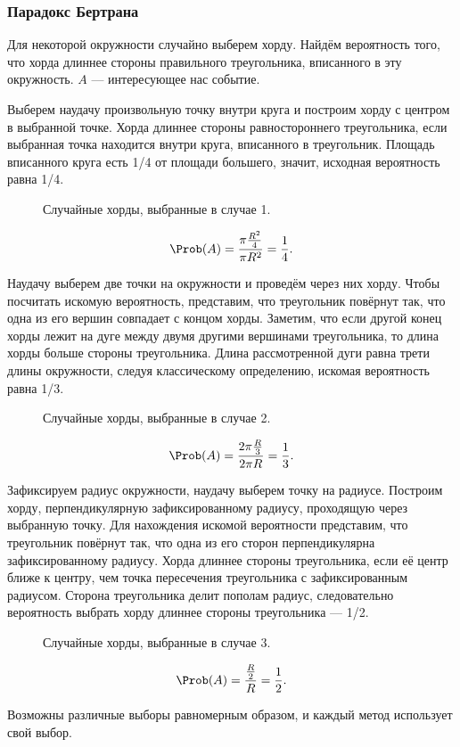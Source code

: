 \subsubsection{Парадокс Бертрана}
Для некоторой окружности случайно выберем хорду. Найдём вероятность того, что хорда длиннее стороны правильного треугольника, вписанного в эту окружность. $A$ --- интересующее нас событие.
\begin{description}[leftmargin=0cm]
	\item[Метод «случайного центра».] Выберем наудачу произвольную точку внутри круга и построим хорду с центром в выбранной точке. Хорда длиннее стороны равностороннего треугольника, если выбранная точка находится внутри круга, вписанного в треугольник. Площадь вписанного круга есть 1/4 от площади большего, значит, исходная вероятность равна 1/4.
	      \begin{figure}[ht]
		      \centering
		      \def\svgwidth{8em}
		      
		      \caption{Случайные хорды, выбранные в случае 1.}
	      \end{figure}
	      \[
		      \Prob(A) = \frac{\pi \frac{R^2}{4}}{\pi R^2} = \frac{1}{4}.
	      \]
	\item[Метод «случайных концов».] Наудачу выберем две точки на окружности и проведём через них хорду. Чтобы посчитать искомую вероятность, представим, что треугольник повёрнут так, что одна из его вершин совпадает с концом хорды. Заметим, что если другой конец хорды лежит на дуге между двумя другими вершинами треугольника, то длина хорды больше стороны треугольника. Длина рассмотренной дуги равна трети длины окружности, следуя классическому определению, искомая вероятность равна 1/3.
	      \begin{figure}[ht]
		      \centering
		      \def\svgwidth{8em}
		      
		      \caption{Случайные хорды, выбранные в случае 2.}
	      \end{figure}
	      \[
		      \Prob(A) = \frac{2\pi \frac{R}{3}}{2 \pi R} = \frac{1}{3}.
	      \]
	\item[Метод «случайного радиуса».] Зафиксируем радиус окружности, наудачу выберем точку на радиусе. Построим хорду, перпендикулярную зафиксированному радиусу, проходящую через выбранную точку. Для нахождения искомой вероятности представим, что треугольник повёрнут так, что одна из его сторон перпендикулярна зафиксированному радиусу. Хорда длиннее стороны треугольника, если её центр ближе к центру, чем точка пересечения треугольника с зафиксированным радиусом. Сторона треугольника делит пополам радиус, следовательно вероятность выбрать хорду длиннее стороны треугольника --- 1/2.
	      \begin{figure}[ht]
		      \centering
		      \def\svgwidth{8em}
		      
		      \caption{Случайные хорды, выбранные в случае 3.}
	      \end{figure}
	      \[ \Prob(A) = \frac{\frac{R}{2}}{R} = \frac{1}{2}. \]
\end{description}
Возможны различные выборы равномерным образом, и каждый метод использует свой выбор.

